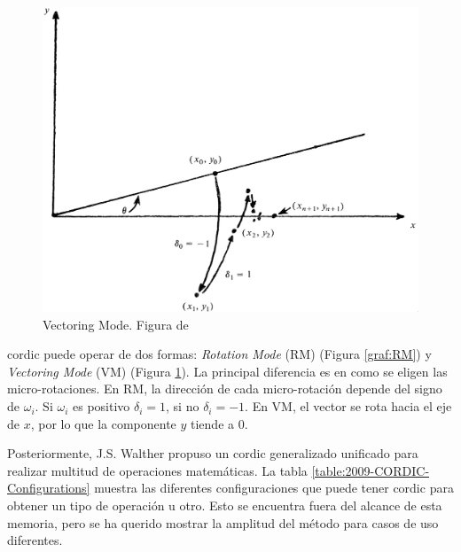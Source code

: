 \begin{figure}[ht]
	\centering
	\includegraphics[width=\textwidth]{archivos/CORDIC/VectoringMode.png}
	\caption{Vectoring Mode. Figura de \cite{schelin_calculator_1983}}
	\label{graf:VM}
\end{figure}

\gls{cordic} puede operar de dos formas: \textit{Rotation Mode} (RM) (Figura \ref{graf:RM}) y \textit{Vectoring Mode} (VM) (Figura \ref{graf:VM}). La principal diferencia es en como se eligen las micro-rotaciones. En RM, la dirección de cada micro-rotación depende del signo de $\omega_{i}$. Si $\omega_{i}$ es positivo $\delta_{i} = 1$, si no $\delta_{i} = -1$. En VM, el vector se rota hacia el eje de $x$, por lo que la componente $y$ tiende a 0.


Posteriormente, J.S. Walther propuso un \gls{cordic} generalizado unificado para realizar multitud de operaciones matemáticas. La tabla \ref{table:2009-CORDIC-Configurations} muestra las diferentes configuraciones que puede tener \gls{cordic} para obtener un tipo de operación u otro. Esto se encuentra fuera del alcance de esta memoria, pero se ha querido mostrar la amplitud del método para casos de uso diferentes.

